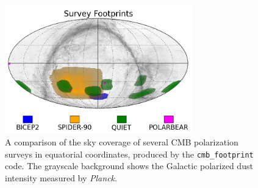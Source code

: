 \documentclass[twocolumn,tighten]{aastex631}
\newcommand{\planck}{\textsl{Planck}}
\begin{document}
\begin{figure}[h!]
    \centering
    \includegraphics[width=3.2in]{fig_2.png}
    \caption{A comparison of the sky coverage of several CMB polarization surveys in equatorial coordinates, produced by the \texttt{cmb\_footprint} code. The grayscale background shows the Galactic polarized dust intensity measured by \planck.}
    \label{fig:footprint}
\end{figure}
\end{document}
